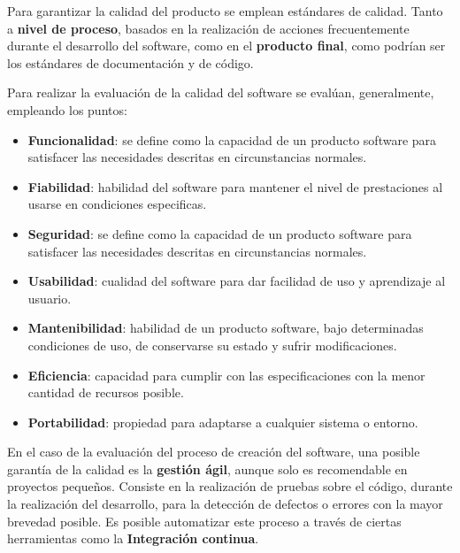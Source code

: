 Para garantizar la calidad del producto se emplean estándares de calidad. Tanto a\textbf{ nivel de proceso}, basados en la realización de acciones frecuentemente durante el desarrollo del software, como en el \textbf{producto final}, como podrían ser los estándares de documentación y de código. 

Para realizar la evaluación de la calidad del software se evalúan, generalmente, empleando los puntos:
\begin{itemize}
	\item \textbf{Funcionalidad}: se define como la capacidad de un producto software para satisfacer las necesidades descritas en circunstancias normales.
	\item \textbf{Fiabilidad}: habilidad del software para mantener el nivel de prestaciones al usarse en condiciones especificas.
	\item \textbf{Seguridad}: se define como la capacidad de un producto software para satisfacer las necesidades descritas en circunstancias normales.
	\item \textbf{Usabilidad}: cualidad del software para dar facilidad de uso y aprendizaje al usuario.
	\item \textbf{Mantenibilidad}: habilidad de un producto software, bajo determinadas condiciones de uso, de conservarse su estado y sufrir modificaciones.
	\item \textbf{Eficiencia}: capacidad  para cumplir con las especificaciones con la menor cantidad de recursos posible.
	\item \textbf{Portabilidad}: propiedad para adaptarse a cualquier sistema o entorno.
\end{itemize}

En el caso de la evaluación del proceso de creación del software, una posible garantía de la calidad es la \textbf{gestión ágil}, aunque solo es recomendable en proyectos pequeños. Consiste en la realización de pruebas sobre el código, durante la realización del desarrollo, para la detección de defectos o errores con la mayor brevedad posible. Es posible automatizar este proceso a través de ciertas herramientas como la \textbf{Integración continua}.

